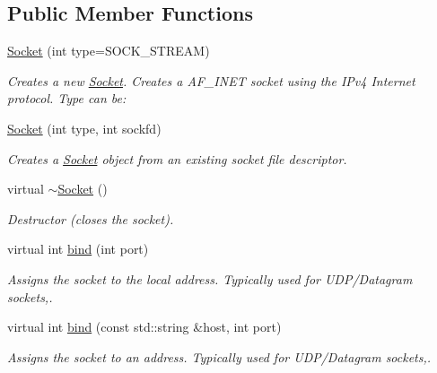 \subsection*{Public Member Functions}
\begin{DoxyCompactItemize}
\item 
\mbox{\hyperlink{classcppu_1_1_socket_ae73b9b629fe443f650203d938f61a279}{Socket}} (int type=S\+O\+C\+K\+\_\+\+S\+T\+R\+E\+AM)
\begin{DoxyCompactList}\small\item\em Creates a new \mbox{\hyperlink{classcppu_1_1_socket}{Socket}}. Creates a A\+F\+\_\+\+I\+N\+ET socket using the I\+Pv4 Internet protocol. Type can be\+: \end{DoxyCompactList}\item 
\mbox{\label{classcppu_1_1_socket_a8404e4e80cc625a4be32aacc879bb237}} 
\mbox{\hyperlink{classcppu_1_1_socket_a8404e4e80cc625a4be32aacc879bb237}{Socket}} (int type, int sockfd)
\begin{DoxyCompactList}\small\item\em Creates a \mbox{\hyperlink{classcppu_1_1_socket}{Socket}} object from an existing socket file descriptor. \end{DoxyCompactList}\item 
\mbox{\label{classcppu_1_1_socket_ae26733a0b7d8a5fb5544d2d069152de7}} 
virtual \mbox{\hyperlink{classcppu_1_1_socket_ae26733a0b7d8a5fb5544d2d069152de7}{$\sim$\+Socket}} ()
\begin{DoxyCompactList}\small\item\em Destructor (closes the socket). \end{DoxyCompactList}\item 
virtual int \mbox{\hyperlink{classcppu_1_1_socket_a7b876dcaff0babaffde41575f9b19d64}{bind}} (int port)
\begin{DoxyCompactList}\small\item\em Assigns the socket to the local address. Typically used for U\+D\+P/\+Datagram sockets,. \end{DoxyCompactList}\item 
virtual int \mbox{\hyperlink{classcppu_1_1_socket_a5698a3a7c6c203676c6de5e5559a0a7f}{bind}} (const std\+::string \&host, int port)
\begin{DoxyCompactList}\small\item\em Assigns the socket to an address. Typically used for U\+D\+P/\+Datagram sockets,. \end{DoxyCompactList}\item 

\end{DoxyCompactItemize}
